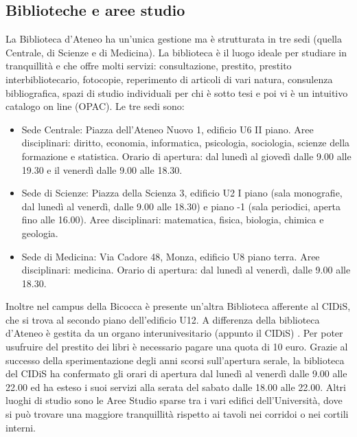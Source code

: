 \subsection{Biblioteche e aree studio}
La Biblioteca d'Ateneo ha un'unica gestione ma è strutturata in tre sedi (quella Centrale, di Scienze e di Medicina). La biblioteca è il luogo ideale per studiare in tranquillità e che offre molti servizi: consultazione, prestito, prestito interbibliotecario, fotocopie, reperimento di articoli di vari natura, consulenza bibliografica, spazi di studio individuali per chi è sotto tesi e poi vi è un intuitivo catalogo on line (OPAC).
Le tre sedi sono:
\begin{itemize}
\item Sede Centrale: Piazza dell'Ateneo Nuovo 1, edificio U6 II piano. Aree disciplinari: diritto, economia, informatica, psicologia, sociologia, scienze della formazione e statistica. Orario di apertura: dal lunedì al giovedì dalle 9.00 alle 19.30 e il venerdì dalle 9.00 alle 18.30.
\item Sede di Scienze: Piazza della Scienza 3, edificio U2 I piano (sala monografie, dal lunedì al venerdì, dalle 9.00 alle 18.30) e piano -1 (sala periodici, aperta fino alle 16.00). Aree disciplinari: matematica, fisica, biologia, chimica e geologia.
\item Sede di Medicina: Via Cadore 48, Monza, edificio U8 piano terra. Aree disciplinari: medicina. Orario di apertura: dal lunedì al venerdì, dalle 9.00 alle 18.30.
\end{itemize}
Inoltre nel campus della Bicocca è presente un'altra Biblioteca afferente al CIDiS, che si trova al secondo piano dell'edificio U12. A differenza della biblioteca d'Ateneo è gestita da un organo interunivesitario (appunto il CIDiS) . Per poter usufruire del prestito dei libri è necessario pagare una quota di 10 euro. Grazie al successo della sperimentazione degli anni scorsi sull'apertura serale, la biblioteca del CIDiS ha confermato gli orari di apertura dal lunedì al venerdì dalle 9.00 alle 22.00 ed ha esteso i suoi servizi alla serata del sabato dalle 18.00 alle 22.00.
Altri luoghi di studio sono le Aree Studio sparse tra i vari edifici dell'Università, dove si può trovare una maggiore tranquillità rispetto ai tavoli nei corridoi o nei cortili interni.

